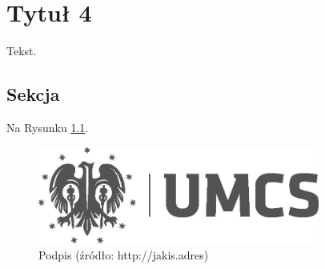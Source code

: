 
\chapter{Tytuł 4}

Tekst.

\section{Sekcja}

Na Rysunku \ref{nazwa_obrazu}.

\begin{figure}[H]
 \centering
 \includegraphics[width=350px]{./img/logo.jpg}
 \caption{Podpis (źródło: http://jakis.adres)}
 \label{nazwa_obrazu}
\end{figure}
